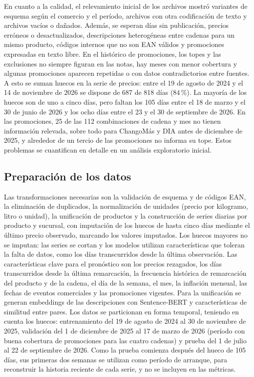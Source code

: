 \documentclass[
11pt, %
]{charter}
\begin{document}
En cuanto a la calidad, el relevamiento inicial de los archivos mostró variantes de esquema según el comercio y el período, archivos con otra codificación de texto y archivos vacíos o dañados. Además, se esperan días sin publicación, precios erróneos o desactualizados, descripciones heterogéneas entre cadenas para un mismo producto, códigos internos que no son EAN válidos y promociones expresadas en texto libre. En el histórico de promociones, los topes y las exclusiones no siempre figuran en las notas, hay meses con menor cobertura y algunas promociones aparecen repetidas o con datos contradictorios entre fuentes. A esto se suman huecos en la serie de precios: entre el 19 de agosto de 2024 y el 14 de noviembre de 2026 se dispone de 687 de 818 días (84\,\%). La mayoría de los huecos son de uno a cinco días, pero faltan los 105 días entre el 18 de marzo y el 30 de junio de 2026 y los ocho días entre el 23 y el 30 de septiembre de 2026. En las promociones, 25 de las 112 combinaciones de cadena y mes no tienen información relevada, sobre todo para ChangoMás y DIA antes de diciembre de 2025, y alrededor de un tercio de las promociones no informa su tope. Estos problemas se cuantifican en detalle en un análisis exploratorio inicial.

\subsection{Preparación de los datos}

Las transformaciones necesarias son la validación de esquema y de códigos EAN, la eliminación de duplicados, la normalización de unidades (precio por kilogramo, litro o unidad), la unificación de productos y la construcción de series diarias por producto y sucursal, con imputación de los huecos de hasta cinco días mediante el último precio observado, marcando los valores imputados. Los huecos mayores no se imputan: las series se cortan y los modelos utilizan características que toleran la falta de datos, como los días transcurridos desde la última observación. Las características clave para el pronóstico son los precios rezagados, los días transcurridos desde la última remarcación, la frecuencia histórica de remarcación del producto y de la cadena, el día de la semana, el mes, la inflación mensual, las fechas de eventos comerciales y las promociones vigentes. Para la unificación se generan embeddings de las descripciones con Sentence-BERT y características de similitud entre pares. Los datos se particionan en forma temporal, teniendo en cuenta los huecos: entrenamiento del 19 de agosto de 2024 al 30 de noviembre de 2025, validación del 1 de diciembre de 2025 al 17 de marzo de 2026 (período con buena cobertura de promociones para las cuatro cadenas) y prueba del 1 de julio al 22 de septiembre de 2026. Como la prueba comienza después del hueco de 105 días, sus primeras dos semanas se utilizan como período de arranque, para reconstruir la historia reciente de cada serie, y no se incluyen en las métricas.
\end{document}
